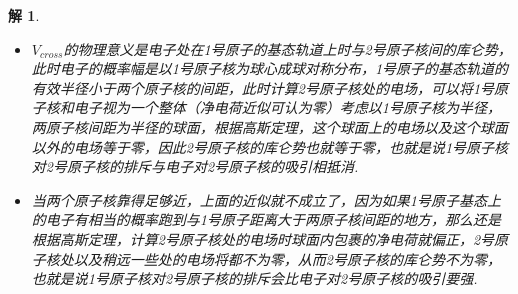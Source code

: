\documentclass[UTF8,10pt,a4paper]{article}
\theoremstyle{Problem}
\theoremstyle{Solution}
\newtheorem*{sol}{解}
\providecommand{\abs}[1]{\left\lvert#1\right\rvert}
\begin{document}
\begin{sol}
\begin{enumerate}
\begin{itemize}
\begin{equation}
\begin{matrix}
                    -t^*&\epsilon+V_{cross}-E
                \end{matrix}\right\rvert=(\epsilon+V_{cross}-E)^2-\abs{t}^2=0.
            \end{equation}
            解得系统的本征能量为
            \begin{equation}
                E=\epsilon+V_{cross}\pm\abs{t}.
            \end{equation}
            \item[$\triangleright$] $V_{cross}$的物理意义是电子处在1号原子的基态轨道上时与2号原子核间的库仑势，此时电子的概率幅是以1号原子核为球心成球对称分布，1号原子的基态轨道的有效半径小于两个原子核的间距，此时计算2号原子核处的电场，可以将1号原子核和电子视为一个整体（净电荷近似可认为零）考虑以1号原子核为半径，两原子核间距为半径的球面，根据高斯定理，这个球面上的电场以及这个球面以外的电场等于零，因此2号原子核的库仑势也就等于零，也就是说1号原子核对2号原子核的排斥与电子对2号原子核的吸引相抵消.
            \item[$\triangleright$] 当两个原子核靠得足够近，上面的近似就不成立了，因为如果1号原子基态上的电子有相当的概率跑到与1号原子距离大于两原子核间距的地方，那么还是根据高斯定理，计算2号原子核处的电场时球面内包裹的净电荷就偏正，2号原子核处以及稍远一些处的电场将都不为零，从而2号原子核的库仑势不为零，也就是说1号原子核对2号原子核的排斥会比电子对2号原子核的吸引要强.
        \end{itemize}
    \end{enumerate}
\end{sol}
\end{document}
